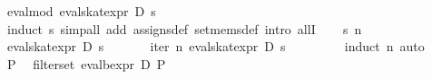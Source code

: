 \begin{isabellebody}
\isanewline
%
\endisadelimproof
\isanewline
{}\isamarkupfalse%
\ eval{}mod{}{}\ {}eval{}skat{}expr\ D\ s\ {}{}\ {}\ {}{}{}\isanewline
%
\isadelimproof
%
\endisadelimproof
%
\isatagproof
{}\isamarkupfalse%
\ {}induct\ s{}\ simp{}all\ add{}\ assigns{}def\ set{}mems{}def{}\ intro\ allI{}\isanewline
\ \ \isamarkupfalse%
\ s\ n\ \isamarkupfalse%
\ {}eval{}skat{}expr\ D\ s\ {}{}\ {}\ {}{}{}\isanewline
\ \ \isamarkupfalse%
\ {}iter\ n\ {}eval{}skat{}expr\ D\ s{}\ {}{}\ {}\ {}{}{}\isanewline
\ \ \ \ \isamarkupfalse%
\ {}induct\ n{}\ auto{}\isanewline
{}\isamarkupfalse%
\isanewline
\ \ \isamarkupfalse%
\ P\ \isamarkupfalse%
\ {}filter{}set\ {}eval{}bexpr\ D\ P{}\ {}{}\ {}\ {}{}{}\isanewline

\end{isabellebody}
